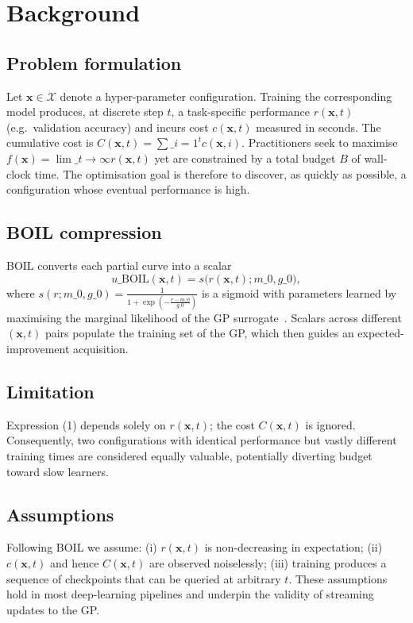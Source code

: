 \documentclass{article} %
\begin{document}
\section{Background}\label{sec:background}

\subsection{Problem formulation}
Let \(\mathbf{x} \in \mathcal{X}\) denote a hyper-parameter configuration. Training the corresponding model produces, at discrete step \(t\), a task-specific performance \(r(\mathbf{x}, t)\) (e.g.\@\ validation accuracy) and incurs cost \(c(\mathbf{x}, t)\) measured in seconds. The cumulative cost is \(C(\mathbf{x}, t) = \sum\limits\_{i=1}^{t} c(\mathbf{x}, i)\). Practitioners seek to maximise \(f(\mathbf{x}) = \lim\limits\_{t \to \infty} r(\mathbf{x}, t)\) yet are constrained by a total budget \(B\) of wall-clock time. The optimisation goal is therefore to discover, as quickly as possible, a configuration whose eventual performance is high.

\subsection{BOIL compression}
BOIL converts each partial curve into a scalar
\begin{equation}\tag{1}
  u\_{\mathrm{BOIL}}(\mathbf{x}, t) = s\big(r(\mathbf{x}, t); m\_0, g\_0\big),
\end{equation}
where \(s(r; m\_0, g\_0) = \frac{1}{1 + \exp\!\left(-\frac{r - m\_0}{g\_0}\right)}\) is a sigmoid with parameters learned by maximising the marginal likelihood of the GP surrogate~\cite{nguyen-2019-bayesian}. Scalars across different \((\mathbf{x}, t)\) pairs populate the training set of the GP\@, which then guides an expected-improvement acquisition.

\subsection{Limitation}
Expression (1) depends solely on \(r(\mathbf{x}, t)\); the cost \(C(\mathbf{x}, t)\) is ignored. Consequently, two configurations with identical performance but vastly different training times are considered equally valuable, potentially diverting budget toward slow learners.

\subsection{Assumptions}
Following BOIL we assume: (i) \(r(\mathbf{x}, t)\) is non-decreasing in expectation; (ii) \(c(\mathbf{x}, t)\) and hence \(C(\mathbf{x}, t)\) are observed noiselessly; (iii) training produces a sequence of checkpoints that can be queried at arbitrary \(t\). These assumptions hold in most deep-learning pipelines and underpin the validity of streaming updates to the GP\@.
\end{document}
